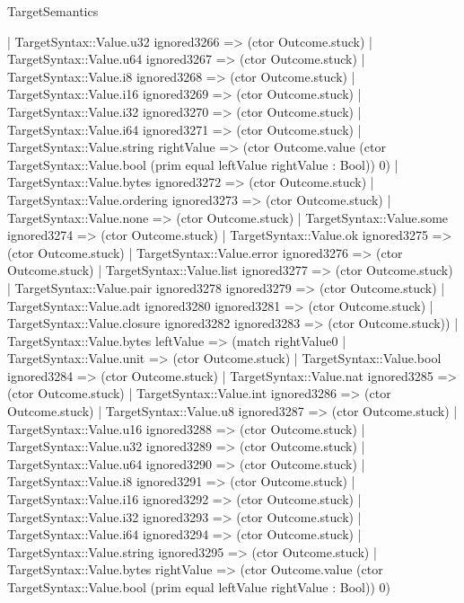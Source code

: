 \begin{lexlean}{TargetSemantics}
\begin{semanticmodule}
{              | TargetSyntax::Value.u32 ignored3266 => (ctor Outcome.stuck)
              | TargetSyntax::Value.u64 ignored3267 => (ctor Outcome.stuck)
              | TargetSyntax::Value.i8 ignored3268 => (ctor Outcome.stuck)
              | TargetSyntax::Value.i16 ignored3269 => (ctor Outcome.stuck)
              | TargetSyntax::Value.i32 ignored3270 => (ctor Outcome.stuck)
              | TargetSyntax::Value.i64 ignored3271 => (ctor Outcome.stuck)
              | TargetSyntax::Value.string rightValue => (ctor Outcome.value (ctor TargetSyntax::Value.bool (prim equal leftValue rightValue : Bool)) 0)
              | TargetSyntax::Value.bytes ignored3272 => (ctor Outcome.stuck)
              | TargetSyntax::Value.ordering ignored3273 => (ctor Outcome.stuck)
              | TargetSyntax::Value.none => (ctor Outcome.stuck)
              | TargetSyntax::Value.some ignored3274 => (ctor Outcome.stuck)
              | TargetSyntax::Value.ok ignored3275 => (ctor Outcome.stuck)
              | TargetSyntax::Value.error ignored3276 => (ctor Outcome.stuck)
              | TargetSyntax::Value.list ignored3277 => (ctor Outcome.stuck)
              | TargetSyntax::Value.pair ignored3278 ignored3279 => (ctor Outcome.stuck)
              | TargetSyntax::Value.adt ignored3280 ignored3281 => (ctor Outcome.stuck)
              | TargetSyntax::Value.closure ignored3282 ignored3283 => (ctor Outcome.stuck))
            | TargetSyntax::Value.bytes leftValue => (match rightValue0
              | TargetSyntax::Value.unit => (ctor Outcome.stuck)
              | TargetSyntax::Value.bool ignored3284 => (ctor Outcome.stuck)
              | TargetSyntax::Value.nat ignored3285 => (ctor Outcome.stuck)
              | TargetSyntax::Value.int ignored3286 => (ctor Outcome.stuck)
              | TargetSyntax::Value.u8 ignored3287 => (ctor Outcome.stuck)
              | TargetSyntax::Value.u16 ignored3288 => (ctor Outcome.stuck)
              | TargetSyntax::Value.u32 ignored3289 => (ctor Outcome.stuck)
              | TargetSyntax::Value.u64 ignored3290 => (ctor Outcome.stuck)
              | TargetSyntax::Value.i8 ignored3291 => (ctor Outcome.stuck)
              | TargetSyntax::Value.i16 ignored3292 => (ctor Outcome.stuck)
              | TargetSyntax::Value.i32 ignored3293 => (ctor Outcome.stuck)
              | TargetSyntax::Value.i64 ignored3294 => (ctor Outcome.stuck)
              | TargetSyntax::Value.string ignored3295 => (ctor Outcome.stuck)
              | TargetSyntax::Value.bytes rightValue => (ctor Outcome.value (ctor TargetSyntax::Value.bool (prim equal leftValue rightValue : Bool)) 0)
}
\end{semanticmodule}
\end{lexlean}
